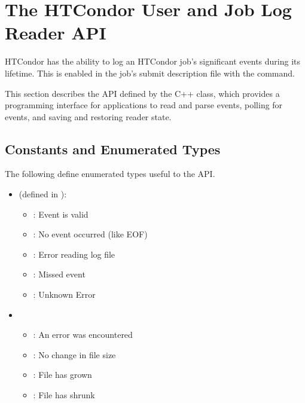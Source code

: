 \section{\label{sec:job-log-reader}The HTCondor User and Job Log Reader API}

HTCondor has the ability to log an HTCondor job's significant events during 
its lifetime.
This is enabled in the job's submit description file with the
 command.

This section describes the API defined by the C++  class,
which provides a programming interface for applications
to read and parse events,
polling for events, and saving and restoring reader state.

\subsection{Constants and Enumerated Types}

The following define enumerated types useful to the API.

\begin{itemize}
\item {} (defined in ):
  \begin{itemize}
    \item {}: Event is valid
    \item {}: No event occurred (like EOF)
    \item {}: Error reading log file
    \item {}: Missed event
    \item {}: Unknown Error
  \end{itemize}

\item {}
  \begin{itemize}
    \item {}: An error was encountered
    \item {}: No change in file size
    \item {}: File has grown
    \item {}: File has shrunk
  \end{itemize}

\end{itemize}


